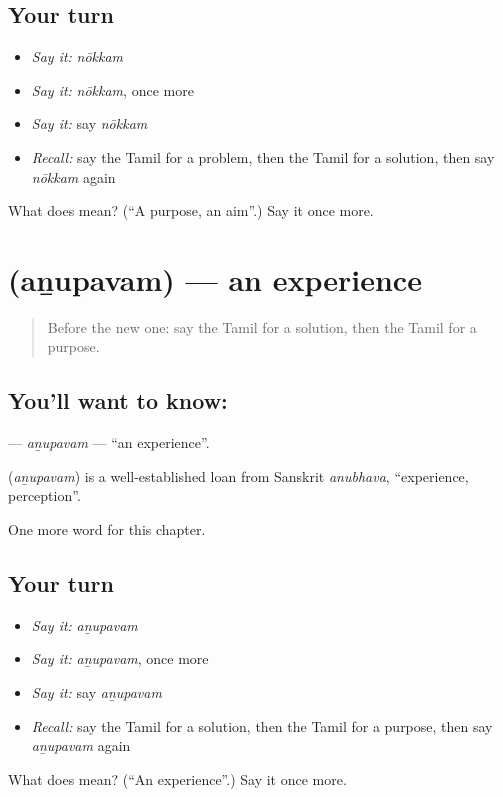\subsection*{Your turn}
\begin{itemize}
\raggedright
  \item \emph{Say it:} \emph{nōkkam}
  \item \emph{Say it:} \emph{nōkkam}, once more
  \item \emph{Say it:} say \emph{nōkkam}
  \item \emph{Recall:} say the Tamil for a problem, then the Tamil for a solution, then say \emph{nōkkam} again
\end{itemize}

\begin{tcolorbox}[breakable,colback=teal!4,colframe=teal!35!black,title={Before you move on}]
What does  mean? (\textquotedblleft{}A purpose, an aim\textquotedblright{}.) Say it once more.
\end{tcolorbox}
\section[\texorpdfstring{\ta{அனுபவம்} (aṉupavam)}{அனுபவம் (aṉupavam)}]{ (aṉupavam) — an experience}

\label{lesson:TA-C177-anupavam}



\begin{quote}
Before the new one: say the Tamil for a solution, then the Tamil for a purpose.
\end{quote}

\subsection*{You'll want to know: }
\textbf{} — \emph{aṉupavam} — \textquotedblleft{}an experience\textquotedblright{}.

\begin{cousinweb}
\textbf{} (\emph{aṉupavam}) is a well-established loan from Sanskrit \emph{anubhava}, \textquotedblleft{}experience, perception\textquotedblright{}.
\end{cousinweb}

\begin{grammarlens}[title={What you've built}]
One more word for this chapter.
\end{grammarlens}

\subsection*{Your turn}
\begin{itemize}
\raggedright
  \item \emph{Say it:} \emph{aṉupavam}
  \item \emph{Say it:} \emph{aṉupavam}, once more
  \item \emph{Say it:} say \emph{aṉupavam}
  \item \emph{Recall:} say the Tamil for a solution, then the Tamil for a purpose, then say \emph{aṉupavam} again
\end{itemize}

\begin{tcolorbox}[breakable,colback=teal!4,colframe=teal!35!black,title={Before you move on}]
What does  mean? (\textquotedblleft{}An experience\textquotedblright{}.) Say it once more.
\end{tcolorbox}
